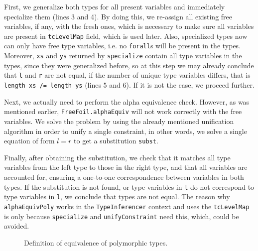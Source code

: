 First, we generalize both types for all present variables and immediately specialize them (lines 3 and 4). By doing this, we re-assign all existing free variables, if any, with the fresh ones, which is necessary to make sure all variables are present in \texttt{tcLevelMap} field, which is used later. Also, specialized types now can only have free type variables, i.e. no \texttt{forall}s will be present in the types. Moreover, \texttt{xs} and \texttt{ys} returned by \texttt{specialize} contain all type variables in the types, since they were generalized before, so at this step we may already conclude that \texttt{l} and \texttt{r} are not equal, if the number of unique type variables differs, that is \texttt{length xs /= length ys} (lines 5 and 6). If it is not the case, we proceed further.

Next, we actually need to perform the alpha equivalence check. However, as was mentioned earlier, \texttt{FreeFoil.alphaEquiv} will not work correctly with the free variables. We solve the problem by using the already mentioned unification algorithm in order to unify a single constraint, in other words, we solve a single equation of form $l = r$ to get a substitution \texttt{subst}.

Finally, after obtaining the substitution, we check that it matches all type variables from the left type to those in the right type, and that all variables are accounted for, ensuring a one-to-one correspondence between variables in both types. If the substitution is not found, or type variables in \texttt{l} do not correspond to type variables in \texttt{l}, we conclude that types are not equal. The reason why \texttt{alphaEquivPoly} works in the \texttt{TypeInferencer} context and uses the \texttt{tcLevelMap} is only because \texttt{specialize} and \texttt{unifyConstraint} need this, which, could be avoided.

\begin{figure}[H]
  \begin{prooftree*}
  \end{prooftree*}

  \caption{Definition of equivalence of polymorphic types.}
\end{figure}

